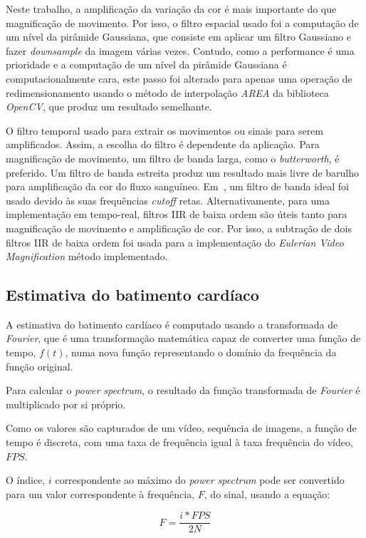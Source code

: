 \documentclass[9pt,a4paper]{extarticle}
\newcommand{\evm}{\emph{Eulerian Video Magnification}}
\begin{document}
\begin{multicols}{2}
Neste trabalho, a amplificação da variação da cor é mais importante do que
magnificação de movimento. Por isso, o filtro espacial usado foi a computação
de um nível da pirâmide Gaussiana, que consiste em aplicar um filtro
Gaussiano e fazer \emph{downsample} da imagem várias vezes. Contudo, como
a performance é uma prioridade e a computação de um nível da pirâmide Gaussiana
é computacionalmente cara, este passo foi alterado para apenas uma operação
de redimensionamento usando o método de interpolação \emph{AREA} da biblioteca
\emph{OpenCV}, que produz um resultado semelhante.

O filtro temporal usado para extrair os movimentos ou sinais para serem
amplificados. Assim, a escolha do filtro é dependente da aplicação. Para
magnificação de movimento, um filtro de banda larga, como o \emph{butterworth},
é preferido. Um filtro de banda estreita produz um resultado mais livre de
barulho para amplificação da cor do fluxo sanguíneo. Em~\cite{Wu2012Eulerian},
um filtro de banda ideal foi usado devido às suas frequências \emph{cutoff}
retas. Alternativamente, para uma implementação em tempo-real, filtros IIR
de baixa ordem são úteis tanto para magnificação de movimento e amplificação
de cor. Por isso, a subtração de dois filtros IIR de baixa ordem foi usada
para a implementação do \evm{} método implementado.

\subsection{Estimativa do batimento cardíaco}\label{sec:work:heart}

A estimativa do batimento cardíaco é computado usando a transformada de
\emph{Fourier}, que é uma transformação matemática capaz de converter uma
função de tempo, $f(t)$, numa nova função representando o domínio da frequência
da função original.

Para calcular o \emph{power spectrum}, o resultado da função transformada
de \emph{Fourier} é multiplicado por si próprio.

Como os valores são capturados de um vídeo, sequência de imagens, a função
de tempo é discreta, com uma taxa de frequência igual à taxa frequência do
vídeo, $FPS$.

O índice, $i$ correspondente ao máximo do \emph{power spectrum} pode ser
convertido para um valor correspondente à frequência, $F$, do sinal, usando
a equação:

\begin{equation}
  F = \frac{i * FPS}{2 N}
\end{equation}


\end{multicols}
\end{document}

